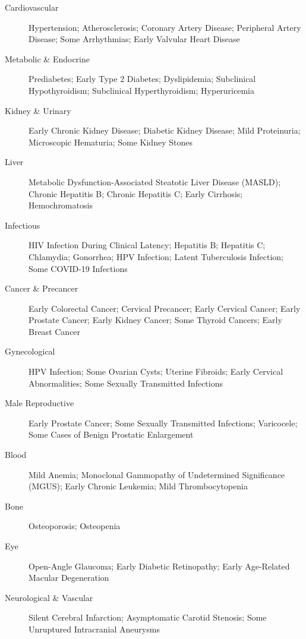 \medskip
\begin{description}
\item[Cardiovascular] Hypertension; Atherosclerosis; Coronary Artery Disease; Peripheral Artery Disease; Some Arrhythmias; Early Valvular Heart Disease

\item[Metabolic \& Endocrine] Prediabetes; Early Type 2 Diabetes; Dyslipidemia; Subclinical Hypothyroidism; Subclinical Hyperthyroidism; Hyperuricemia

\item[Kidney \& Urinary] Early Chronic Kidney Disease; Diabetic Kidney Disease; Mild Proteinuria; Microscopic Hematuria; Some Kidney Stones

\item[Liver] Metabolic Dysfunction-Associated Steatotic Liver Disease (MASLD); Chronic Hepatitis B; Chronic Hepatitis C; Early Cirrhosis; Hemochromatosis

\item[Infectious] HIV Infection During Clinical Latency; Hepatitis B; Hepatitis C; Chlamydia; Gonorrhea; HPV Infection; Latent Tuberculosis Infection; Some COVID-19 Infections

\item[Cancer \& Precancer] Early Colorectal Cancer; Cervical Precancer; Early Cervical Cancer; Early Prostate Cancer; Early Kidney Cancer; Some Thyroid Cancers; Early Breast Cancer

\item[Gynecological] HPV Infection; Some Ovarian Cysts; Uterine Fibroids; Early Cervical Abnormalities; Some Sexually Transmitted Infections

\item[Male Reproductive] Early Prostate Cancer; Some Sexually Transmitted Infections; Varicocele; Some Cases of Benign Prostatic Enlargement

\item[Blood] Mild Anemia; Monoclonal Gammopathy of Undetermined Significance (MGUS); Early Chronic Leukemia; Mild Thrombocytopenia

\item[Bone] Osteoporosis; Osteopenia

\item[Eye] Open-Angle Glaucoma; Early Diabetic Retinopathy; Early Age-Related Macular Degeneration

\item[Neurological \& Vascular] Silent Cerebral Infarction; Asymptomatic Carotid Stenosis; Some Unruptured Intracranial Aneurysms


\end{description}
